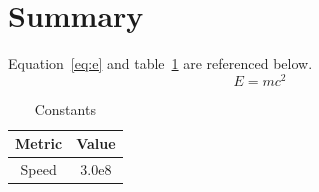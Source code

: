 \documentclass{article}
\begin{document}
\section{Summary}
Equation~\eqref{eq:e} and table~\ref{tab:t} are referenced below.
\begin{equation}\label{eq:e}
  E = mc^2
\end{equation}
\begin{table}[h]
\centering
\begin{tabular}{|c|c|}
\hline
Metric & Value \\
\hline
Speed & 3.0e8 \\
\hline
\end{tabular}
\caption{Constants}
\label{tab:t}
\end{table}
\end{document}

